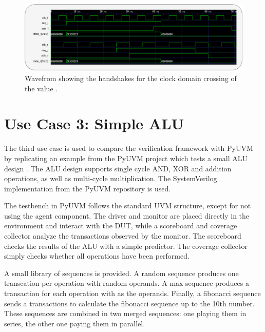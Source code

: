 \begin{figure}[t]
  \centering
  \includegraphics[width=\textwidth]{diagrams/cdc_timing.pdf}
  \caption{Wavefrom showing the handshakes for the clock domain crossing of the value .}
  \label{fig:cdc_timing}
\end{figure}

\section{Use Case 3: Simple ALU} %

The third use case is used to compare the verification framework with PyUVM by replicating an example from the PyUVM
project which tests a small ALU design \cite{pyuvm_tinyalu}. The ALU design supports single cycle AND, XOR and
addition operations, as well as multi-cycle multiplication. The SystemVerilog implementation from the PyUVM repository is used.

The testbench in PyUVM follows the standard UVM structure, except for not using the agent component. The driver and
monitor are placed directly in the environment and interact with the DUT, while a scoreboard and coverage collector
analyze the transactions observed by the monitor. The scoreboard checks the results of the ALU with a simple
predictor. The coverage collector simply checks whether all operations have been performed.

A small library of sequences is provided. A random sequence produces one transcation per operation with random
operands. A max sequence produces a transaction for each operation with  as the operands. Finally, a
fibonacci sequence sends a transactions to calculate the fibonacci sequence up to the 10th number. These sequences
are combined in two merged sequences: one playing them in series, the other one paying them in parallel.

